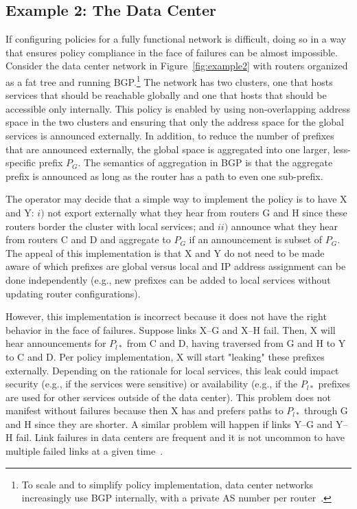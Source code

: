 \subsection{Example 2:  The Data Center}

If configuring policies for a fully functional network is difficult, doing so in a way that ensures policy compliance in the face of failures can be almost impossible. Consider the data center network in Figure~\ref{fig:example2} with routers organized as a fat tree and running BGP.\footnote{To scale and to simplify policy implementation, data center networks increasingly use BGP internally, with a private AS number per router~\cite{bgp-in-dc-rfc}.} The network has two clusters, one that hosts services that should be reachable globally and one that hosts that should be accessible only internally. This policy is enabled by using non-overlapping address space in the two clusters and ensuring that only the address space for the global services is announced externally. In addition, to reduce the number of prefixes that are announced externally, the global space is aggregated into one larger, less-specific prefix $P_G$. The semantics of aggregation in BGP is that the aggregate prefix is announced as long as the router has a path to even one sub-prefix.

The operator may decide that a simple way to implement the policy is to have X and Y: $i)$ not export externally what they hear from routers G and H since these routers border the cluster with local services; and $ii)$ announce what they hear from routers C and D and aggregate to $P_G$ if an announcement is subset of $P_G$. The appeal of this implementation is that X and Y do not need to be made aware of which prefixes are global versus local and IP address assignment can be done independently (e.g., new prefixes can be added to local services without updating router configurations).

However, this implementation is incorrect because it does not have the right behavior in the face of failures. Suppose links X--G and X--H fail. Then, X will hear announcements for $P_{l*}$ from C and D, having traversed from G and H to Y to C and D. Per policy implementation, X will start "leaking" these prefixes externally. Depending on the rationale for local services, this leak could impact security (e.g., if the services were sensitive) or availability (e.g., if the $P_{l*}$ prefixes are used for other services outside of the data center). This problem does not manifest without failures because then X has and prefers paths to $P_{l*}$ through G and H since they are shorter. A similar problem will happen if links Y--G and Y--H fail.
Link failures in data centers are frequent and it is not uncommon to have multiple failed links at a given time~\cite{dc-failure-study}.

